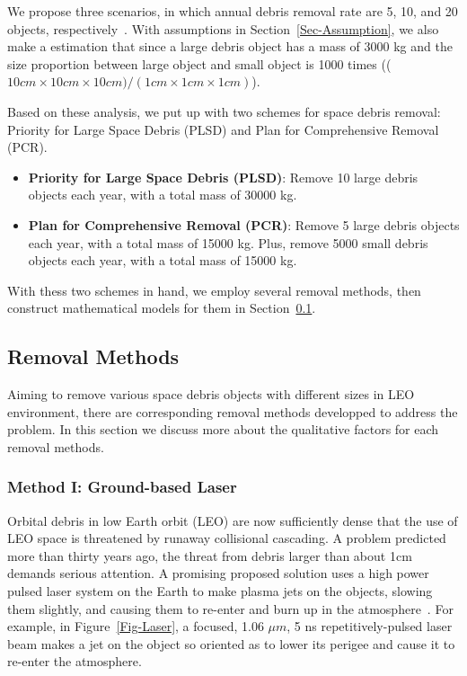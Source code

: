 \documentclass{mcmthesis}
\begin{document}
	We propose three scenarios, in which annual debris removal rate are 5, 10, and 20 objects, respectively~\cite{Liou}. With assumptions in Section~\ref{Sec-Assumption}, we also make a estimation that since a large debris object has a mass of 3000 kg and the size proportion between large object and small object is 1000 times (($10 cm\times10 cm\times10 cm)/(1 cm\times1 cm\times1 cm)$).
	
	Based on these analysis, we put up with two schemes for space debris removal: Priority for Large Space Debris (PLSD) and Plan for Comprehensive Removal (PCR).
	
	\begin{itemize}
		\item \textbf{Priority for Large Space Debris (PLSD)}: Remove 10 large debris objects each year, with a total mass of 30000 kg.
		\item \textbf{Plan for Comprehensive Removal (PCR)}: Remove 5 large debris objects each year, with a total mass of 15000 kg. Plus, remove 5000 small debris objects each year, with a total mass of 15000 kg.
	\end{itemize}
	
	With thess two schemes in hand, we employ several removal methods, then construct mathematical models for them in Section~\ref{Sec-RemovalMethods}.
	
	\subsection{Removal Methods}\label{Sec-RemovalMethods}
	
	Aiming to remove various space debris objects with different sizes in LEO environment, there are corresponding removal methods developped to address the problem. In this section we discuss more about the qualitative factors for each removal methods.
	
	\subsubsection{Method I: Ground-based Laser}
	
	Orbital debris in low Earth orbit (LEO) are now sufficiently dense that the use of LEO space is threatened by runaway collisional cascading. A problem predicted more than thirty years ago, the threat from debris larger than about 1cm demands serious attention. A promising proposed solution uses a high power pulsed laser system on the Earth to make plasma jets on the objects, slowing them slightly, and causing them to re-enter and burn up in the atmosphere~\cite{Phipps}. For example, in Figure~\ref{Fig-Laser}, a focused, 1.06 $\mu m$, 5 ns repetitively-pulsed laser beam makes a jet on the object so oriented as to lower its perigee and cause it to re-enter the atmosphere.
	
\end{document}
